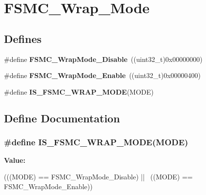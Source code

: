 \hypertarget{group__FSMC__Wrap__Mode}{
\section{FSMC\_\-Wrap\_\-Mode}
\label{group__FSMC__Wrap__Mode}
}
\subsection*{Defines}
\begin{DoxyCompactItemize}
\item 
\hypertarget{group__FSMC__Wrap__Mode_ga6041f0d3055ea3811a5a19560092f266}{
\#define {\bfseries FSMC\_\-WrapMode\_\-Disable}~((uint32\_\-t)0x00000000)}
\label{group__FSMC__Wrap__Mode_ga6041f0d3055ea3811a5a19560092f266}

\item 
\hypertarget{group__FSMC__Wrap__Mode_gad07eb0ae0362b2f94071d0dab6473fda}{
\#define {\bfseries FSMC\_\-WrapMode\_\-Enable}~((uint32\_\-t)0x00000400)}
\label{group__FSMC__Wrap__Mode_gad07eb0ae0362b2f94071d0dab6473fda}

\item 
\#define {\bfseries IS\_\-FSMC\_\-WRAP\_\-MODE}(MODE)
\end{DoxyCompactItemize}


\subsection{Define Documentation}
\hypertarget{group__FSMC__Wrap__Mode_ga0751d74b7fb1e17f6cedea091e8ebfc8}{
\subsubsection[{IS\_\-FSMC\_\-WRAP\_\-MODE}]{\setlength{\rightskip}{0pt plus 5cm}\#define IS\_\-FSMC\_\-WRAP\_\-MODE(MODE)}}
\label{group__FSMC__Wrap__Mode_ga0751d74b7fb1e17f6cedea091e8ebfc8}
{\bfseries Value:}
\begin{DoxyCode}
(((MODE) == FSMC_WrapMode_Disable) || \
                                 ((MODE) == FSMC_WrapMode_Enable))
\end{DoxyCode}
